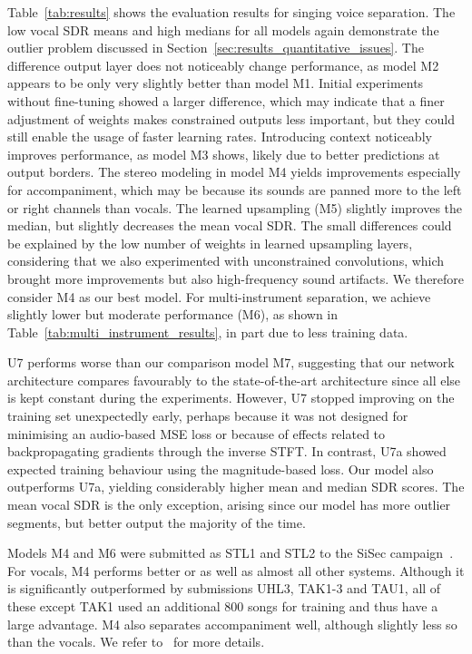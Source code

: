 \documentclass{article}
\begin{document}
Table~\ref{tab:results} shows the evaluation results for singing voice separation.
The low vocal SDR means and high medians for all models again demonstrate the outlier problem discussed in Section~\ref{sec:results_quantitative_issues}.
The difference output layer does not noticeably change performance, as model M2 appears to be only very slightly better than model M1.
Initial experiments without fine-tuning showed a larger difference, which may indicate that a finer adjustment of weights makes constrained outputs less important, but they could still enable the usage of faster learning rates.
Introducing context noticeably improves performance, as model M3 shows, likely due to better predictions at output borders.
The stereo modeling in model M4 yields improvements especially for accompaniment, which may be because its sounds are panned more to the left or right channels than vocals.
The learned upsampling (M5) slightly improves the median, but slightly decreases the mean vocal SDR.
The small differences could be explained by the low number of weights in learned upsampling layers, considering that we also experimented with unconstrained convolutions, which brought more improvements but also high-frequency sound artifacts. We therefore consider M4 as our best model.
For multi-instrument separation, we achieve slightly lower but moderate performance (M6), as shown in Table~\ref{tab:multi_instrument_results}, in part due to less training data.

U7 performs worse than our comparison model M7, suggesting that our network architecture compares favourably to the state-of-the-art architecture since all else is kept constant during the experiments.
However, U7 stopped improving on the training set unexpectedly early, perhaps because it was not designed for minimising an audio-based MSE loss or because of effects related to backpropagating gradients through the inverse STFT. 
In contrast, U7a showed expected training behaviour using the magnitude-based loss. 
Our model also outperforms U7a, yielding considerably higher mean and median SDR scores.
The mean vocal SDR is the only exception, arising since our model has more outlier segments, but better output the majority of the time.

Models M4 and M6 were submitted as STL1 and STL2 to the SiSec campaign~\cite{Stoter2018}.
For vocals, M4 performs better or as well as almost all other systems.
Although it is significantly outperformed by submissions UHL3, TAK1-3 and TAU1, all of these except TAK1 used an additional 800 songs for training and thus have a large advantage.
M4 also separates accompaniment well, although slightly less so than the vocals. We
refer to~\cite{Stoter2018} for more details.
\end{document}
